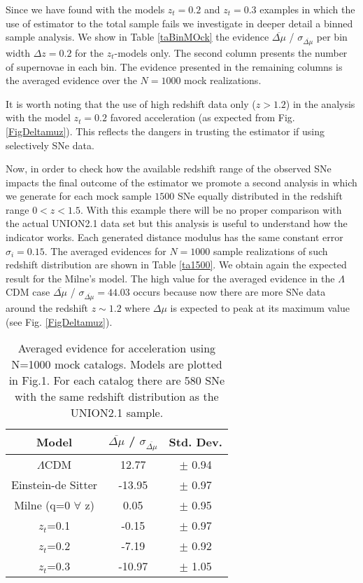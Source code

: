 \documentclass[nofootinbib,twocolumn]{revtex4}
\begin{document}
Since we have found with the models $z_t=0.2$ and $z_t=0.3$ examples in which the use of estimator to the total sample fails we investigate in deeper detail a binned sample analysis. We show in Table \ref{taBinMOck} the evidence $\overline{\Delta \mu}$ / $\sigma_{\overline{\Delta\mu}}$ per bin width $\Delta z = 0.2$ for the $z_t$-models only. The second column presents the number of supernovae in each bin. The evidence presented in the remaining columns is the averaged evidence over the $N=1000$ mock realizations. 

It is worth noting that the use of high redshift data only ($z>1.2$) in the analysis with the model $z_t=0.2$ favored acceleration (as expected from Fig.\ref{FigDeltamuz}). This reflects the dangers in trusting the estimator if using selectively SNe data.


Now, in order to check how the available redshift range of the observed SNe impacts the final outcome of the estimator we promote a second analysis in which we generate for each mock sample $1500$ SNe equally distributed in the redshift range $0<z<1.5$. With this example there will be no proper comparison with the actual UNION2.1 data set but this analysis is useful to understand how the indicator works. Each generated distance modulus has the same constant error $\sigma_i = 0.15$. The averaged evidences for $N=1000$ sample realizations of such redshift distribution are shown in Table \ref{ta1500}. We obtain again the expected result for the Milne's model. The high value for the averaged evidence in the $\Lambda$CDM case $\overline{\Delta \mu}$ / $\sigma_{\overline{\Delta\mu}}=44.03$ occurs because now there are more SNe data around the redshift $z\sim 1.2$ where $\Delta \mu$ is expected to peak at its maximum value (see Fig. \ref{FigDeltamuz}). 










\begin{table}
\centering\caption{Averaged evidence for acceleration using N=1000 mock catalogs. Models are plotted in Fig.1. For each catalog there are 580 SNe with the same redshift distribution as the UNION2.1 sample.}
{\begin{tabular} {c||c||c}
Model & $\overline{\Delta \mu}$ / $\sigma_{\overline{\Delta\mu}}$   & Std. Dev. \\
\hline \hline 
$\Lambda$CDM &  12.77 & $\pm$ 0.94  \\
Einstein-de Sitter&  -13.95 & $\pm$ 0.97\\
Milne (q=0 $\forall$ z) &  0.05 & $\pm$ 0.95  \\
$z_t$=0.1 &  -0.15& $\pm$ 0.97  \\
$z_t$=0.2 &  -7.19& $\pm$ 0.92  \\
$z_t$=0.3 &  -10.97& $\pm$ 1.05  \\
\hline
\end{tabular}} 
\label{taUNION}
\end{table}
\end{document}
